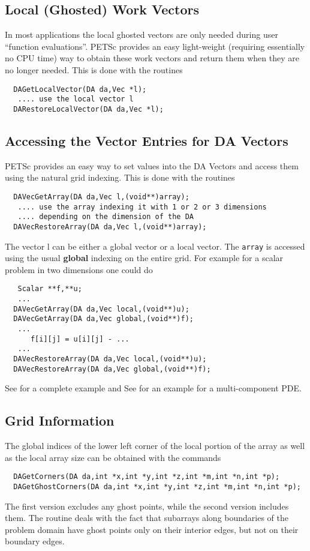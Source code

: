 \subsection{Local (Ghosted) Work Vectors}
In most applications the local ghosted vectors are only needed during user
``function evaluations''. PETSc provides an easy light-weight (requiring 
essentially no CPU time) way to obtain these work vectors and return them when
they are no longer needed. This is done with the routines
\begin{verbatim}
  DAGetLocalVector(DA da,Vec *l);
   .... use the local vector l
  DARestoreLocalVector(DA da,Vec *l);
\end{verbatim}

\subsection{Accessing the Vector Entries for DA Vectors}
PETSc provides an easy way to set values into the DA Vectors and access them using
the natural grid indexing. This is done with the routines 
\begin{verbatim}
  DAVecGetArray(DA da,Vec l,(void**)array);
   .... use the array indexing it with 1 or 2 or 3 dimensions 
   .... depending on the dimension of the DA
  DAVecRestoreArray(DA da,Vec l,(void**)array);
\end{verbatim}
The vector l can be either a global vector or a local vector.
The {\tt array} is accessed using the usual {\bf global} indexing
on the entire grid.
For example for a scalar problem in two dimensions one could do
\begin{verbatim}
   Scalar **f,**u;
   ...
  DAVecGetArray(DA da,Vec local,(void**)u);
  DAVecGetArray(DA da,Vec global,(void**)f);
   ...
      f[i][j] = u[i][j] - ...
   ...
  DAVecRestoreArray(DA da,Vec local,(void**)u);
  DAVecRestoreArray(DA da,Vec global,(void**)f);
\end{verbatim}
See  for a 
complete example and See  for an
example for a multi-component PDE.

\subsection{Grid Information}

The global indices of the lower left corner of the local portion of the array 
as well as the local array size can be obtained with the commands
 
\begin{verbatim}
  DAGetCorners(DA da,int *x,int *y,int *z,int *m,int *n,int *p);
  DAGetGhostCorners(DA da,int *x,int *y,int *z,int *m,int *n,int *p);
\end{verbatim}
The first version excludes any ghost points, while the second version
includes them. 
The routine  
deals with the fact that subarrays along boundaries of the problem
domain have ghost points only on their interior edges, but not on
their boundary edges.

